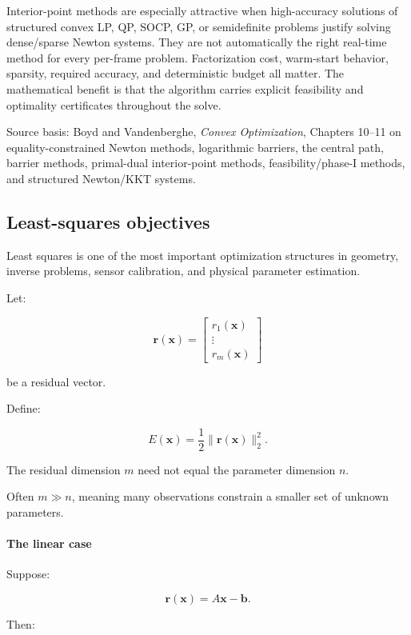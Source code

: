 Interior-point methods are especially attractive when high-accuracy solutions of structured convex LP, QP, SOCP, GP, or semidefinite problems justify solving dense/sparse Newton systems. They are not automatically the right real-time method for every per-frame problem. Factorization cost, warm-start behavior, sparsity, required accuracy, and deterministic budget all matter. The mathematical benefit is that the algorithm carries explicit feasibility and optimality certificates throughout the solve.

Source basis: Boyd and Vandenberghe, \emph{Convex Optimization}, Chapters 10--11 on equality-constrained Newton methods, logarithmic barriers, the central path, barrier methods, primal-dual interior-point methods, feasibility/phase-I methods, and structured Newton/KKT systems.

\subsection{Least-squares objectives}\label{02-foundations-ii-ch026-least-squares-objectives}

Least squares is one of the most important optimization structures in geometry, inverse problems, sensor calibration, and physical parameter estimation.

Let:

\[
\mathbf r(\mathbf x)= \begin{bmatrix} r_1(\mathbf x)\\ \vdots\\ r_m(\mathbf x) \end{bmatrix}
\]

be a residual vector.

Define:

\[
\boxed{ E(\mathbf x)=\frac12\|\mathbf r(\mathbf x)\|_2^2 }.
\]

The residual dimension \(m\) need not equal the parameter dimension \(n\).

Often \(m\gg n\), meaning many observations constrain a smaller set of unknown parameters.

\paragraph{The linear case}\label{02-foundations-ii-ch026-the-linear-case}

Suppose:

\[
\mathbf r(\mathbf x)=A\mathbf x-\mathbf b.
\]

Then:

